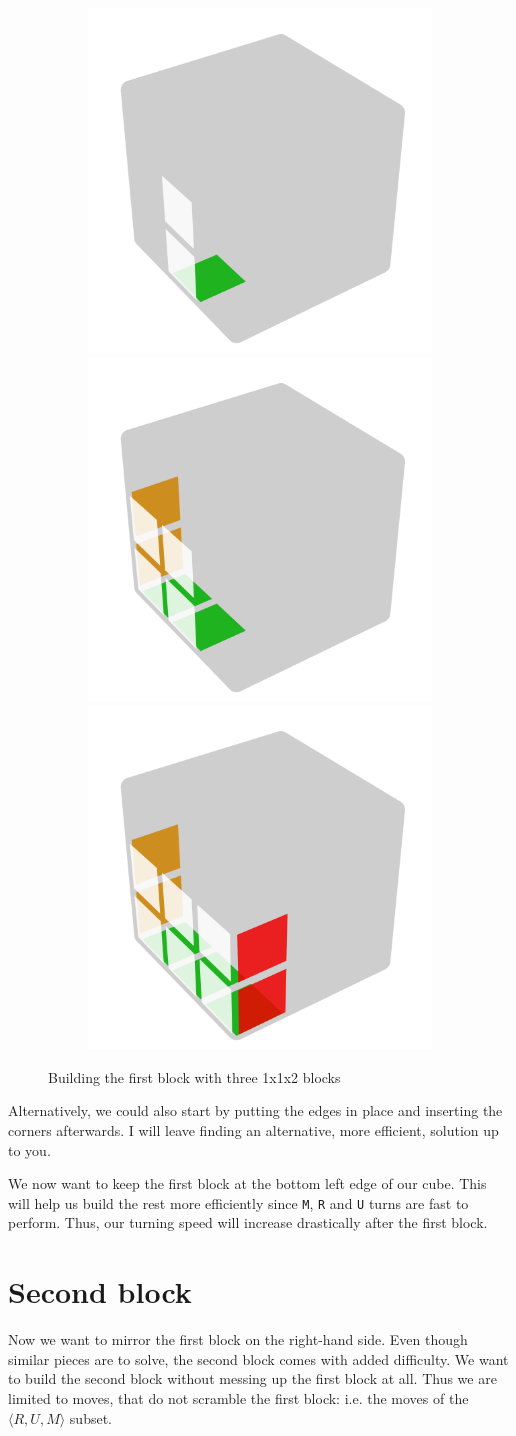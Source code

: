 \documentclass[a4paper]{scrreprt}
\begin{document}
\begin{figure}[h]
\centering
\begin{subfigure}{.9\textwidth}
   \includegraphics[width=.3\linewidth]{resources/fb_1.png}
  \includegraphics[width=.3\linewidth]{resources/fb_2.png}
  \includegraphics[width=.3\linewidth]{resources/fb_3.png}
\end{subfigure}
\caption*{Building the first block with three 1x1x2 blocks}
\end{figure}

Alternatively, we could also start by putting the edges in place and inserting the corners afterwards. I will leave finding an alternative, more efficient, solution up to you.\par

We now want to keep the first block at the bottom left edge of our cube. This will help us build the rest more efficiently since \texttt{M}, \texttt{R} and \texttt{U} turns are fast to perform. Thus, our turning speed will increase drastically after the first block.\par

\section{Second block}
Now we want to mirror the first block on the right-hand side. Even though similar pieces are to solve, the second block comes with added difficulty. We want to build the second block without messing up the first block at all. Thus we are limited to moves, that do not scramble the first block: i.e. the moves of the $\langle R, U, M \rangle$ subset.\par
\end{document}
